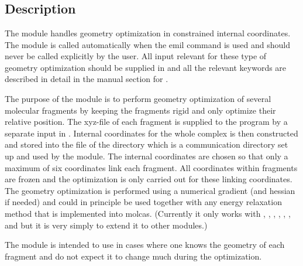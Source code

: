 
\section{}
\label{UG:sec:geo}

\subsection{Description}
\label{UG:sec:geo_description}


The  module handles geometry optimization in constrained
internal coordinates\cite{Vysotskiy:13}. The module is called automatically when the 
emil command  is used and should never be called 
explicitly by the user. All input relevant for these type of geometry
optimization should be supplied in  and all the relevant
 keywords are described in detail in the manual section for .

The purpose of the  module is to perform geometry optimization of
several molecular fragments by keeping the fragments rigid and only optimize
their relative position. The xyz-file of each fragment is supplied to the 
program by a separate  input in . Internal
coordinates for the whole complex is then constructed and stored into the
file  of the
directory  which is a communication directory set up and 
used by the  module. The internal coordinates are chosen so that
only a maximum of six coordinates link each fragment. All coordinates within
fragments are frozen and the optimization is only carried out for these 
linking coordinates. The geometry optimization is performed using a numerical
gradient (and hessian if needed) and could in principle be used together
 with any energy
relaxation method that is implemented into molcas. (Currently it only works
 with , , , , 
, , and  but it is very simply to extend
it to other modules.)

The module is intended to use in cases where one knows 
the geometry of each fragment and do not expect it to change much during the 
optimization. 

